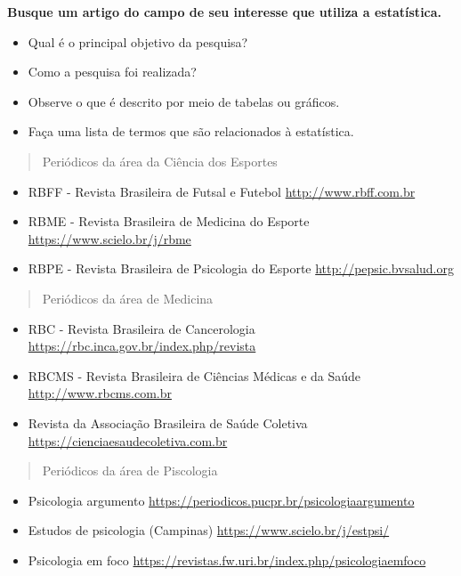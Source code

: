 \documentclass[
]{book}
\begin{document}
\textbf{Busque um artigo do campo de seu interesse que utiliza a estatística.}

\begin{itemize}
\item
  Qual é o principal objetivo da pesquisa?
\item
  Como a pesquisa foi realizada?
\item
  Observe o que é descrito por meio de tabelas ou gráficos.
\item
  Faça uma lista de termos que são relacionados à estatística.
\end{itemize}

\begin{quote}
Periódicos da área da Ciência dos Esportes
\end{quote}

\begin{itemize}
\item
  RBFF - Revista Brasileira de Futsal e Futebol \url{http://www.rbff.com.br}
\item
  RBME - Revista Brasileira de Medicina do Esporte \url{https://www.scielo.br/j/rbme}
\item
  RBPE - Revista Brasileira de Psicologia do Esporte \url{http://pepsic.bvsalud.org}
\end{itemize}

\begin{quote}
Periódicos da área de Medicina
\end{quote}

\begin{itemize}
\item
  RBC - Revista Brasileira de Cancerologia \url{https://rbc.inca.gov.br/index.php/revista}
\item
  RBCMS - Revista Brasileira de Ciências Médicas e da Saúde \url{http://www.rbcms.com.br}
\item
  Revista da Associação Brasileira de Saúde Coletiva \url{https://cienciaesaudecoletiva.com.br}
\end{itemize}

\begin{quote}
Periódicos da área de Piscologia
\end{quote}

\begin{itemize}
\item
  Psicologia argumento \url{https://periodicos.pucpr.br/psicologiaargumento}
\item
  Estudos de psicologia (Campinas) \url{https://www.scielo.br/j/estpsi/}
\item
  Psicologia em foco \url{https://revistas.fw.uri.br/index.php/psicologiaemfoco}
\end{itemize}
\end{document}
